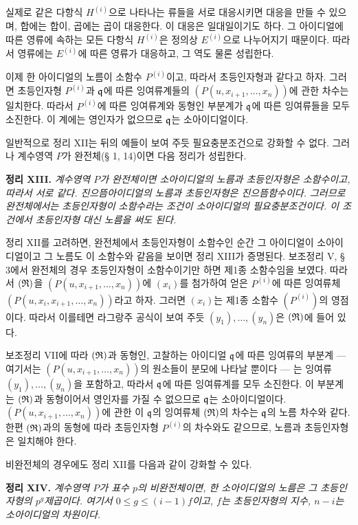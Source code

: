 실제로 같은 다항식 \(H^{(i)}\)으로 나타나는 류들을 서로 대응시키면 대응을 만들 수 있으며, 합에는 합이, 곱에는 곱이 대응한다. 이 대응은 일대일이기도 하다. 그 아이디얼에 따른 영류에 속하는 모든 다항식 \(H^{(i)}\)은 정의상 \(E^{(i)}\)으로 나누어지기 때문이다. 따라서 영류에는 \(E^{(i)}\)에 따른 영류가 대응하고, 그 역도 물론 성립한다.

이제 한 아이디얼의 노름이 소함수 \(P^{(i)}\)이고, 따라서 초등인자형과 같다고 하자. 그러면 초등인자형 \(P^{(i)}\)과 \(\mathfrak q\)에 따른 잉여류계들의 \((P(u,x_{i+1},\ldots,x_n))\)에 관한 차수는 일치한다. 따라서 \(P^{(i)}\)에 따른 잉여류계와 동형인 부분계가 \(\mathfrak q\)에 따른 잉여류들을 모두 소진한다. 이 계에는 영인자가 없으므로 \(\mathfrak q\)는 소아이디얼이다.

일반적으로 정리 XII는 뒤의 예들이 보여 주듯 필요충분조건으로 강화할 수 없다. 그러나 계수영역 \(P\)가 완전체(§ 1, 14)이면 다음 정리가 성립한다.

\textbf{정리 XIII.} \emph{계수영역 \(P\)가 완전체이면 소아이디얼의 노름과 초등인자형은 소함수이고, 따라서 서로 같다. 진으뜸아이디얼의 노름과 초등인자형은 진으뜸함수이다. 그러므로 완전체에서는 초등인자형이 소함수라는 조건이 소아이디얼의 필요충분조건이다. 이 조건에서 초등인자형 대신 노름을 써도 된다.}

정리 XII를 고려하면, 완전체에서 초등인자형이 소함수인 순간 그 아이디얼이 소아이디얼이고 그 노름도 이 소함수와 같음을 보이면 정리 XIII가 증명된다. 보조정리 V, § 3에서 완전체의 경우 초등인자형이 소함수이기만 하면 제1종 소함수임을 보였다. 따라서 \((\mathfrak{R})\)을 \((P(u,x_{i+1},\ldots,x_n))\)에 \((x_i)\)를 첨가하여 얻은 \(P^{(i)}\)에 따른 잉여류체 \((P(u,x_i,x_{i+1},\ldots,x_n))\)라고 하자. 그러면 \((x_i)\)는 제1종 소함수 \((P^{(i)})\)의 영점이다. 따라서 이를테면 라그랑주 공식이 보여 주듯 \((y_1),\ldots,(y_n)\)은 \((\mathfrak{R})\)에 들어 있다.

보조정리 VII에 따라 \((\mathfrak{R})\)과 동형인, 고찰하는 아이디얼 \(\mathfrak q\)에 따른 잉여류의 부분계 --- 여기서는 \((P(u,x_{i+1},\ldots,x_n))\)의 원소들이 분모에 나타날 뿐이다 --- 는 잉여류 \((y_1),\ldots,(y_n)\)을 포함하고, 따라서 \(\mathfrak q\)에 따른 잉여류계를 모두 소진한다. 이 부분계는 \((\mathfrak{R})\)과 동형이어서 영인자를 가질 수 없으므로 \(\mathfrak q\)는 소아이디얼이다. \((P(u,x_{i+1},\ldots,x_n))\)에 관한 이 \(\mathfrak q\)의 잉여류체 \((\mathfrak{R})\)의 차수는 \(\mathfrak q\)의 노름 차수와 같다. 한편 \((\mathfrak{R})\)과의 동형에 따라 초등인자형 \(P^{(i)}\)의 차수와도 같으므로, 노름과 초등인자형은 일치해야 한다.

비완전체의 경우에도 정리 XII를 다음과 같이 강화할 수 있다.

\textbf{정리 XIV.} \emph{계수영역 \(P\)가 표수 \(p\)의 비완전체이면, 한 소아이디얼의 노름은 그 초등인자형의 \(p^g\)제곱이다. 여기서 \(0\leq g\leq(i-1)f\)이고, \(f\)는 초등인자형의 지수, \(n-i\)는 소아이디얼의 차원이다.}

